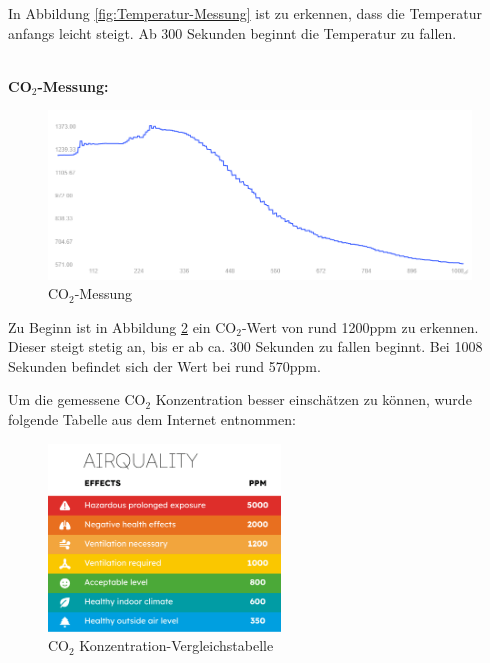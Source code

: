 \begin{inhalt}
In Abbildung \ref{fig:Temperatur-Messung} ist zu erkennen, dass die Temperatur anfangs leicht steigt. Ab 300 Sekunden beginnt die Temperatur zu fallen. 

\bigskip \\

\textbf{CO$_2$-Messung:}

\begin{figure}[!htb]
\centering
\includegraphics[width=1\textwidth]{files/Tobias/pics/Messungen/co2.PNG}
\caption[CO$_2$-Messung]{CO$_2$-Messung}
\label{fig:CO$_2$-Messung}
\end{figure}

Zu Beginn ist in Abbildung \ref{fig:CO$_2$-Messung} ein CO$_2$-Wert von rund 1200ppm zu erkennen. Dieser steigt stetig an, bis er ab ca. 300 Sekunden zu fallen beginnt. Bei 1008 Sekunden befindet sich der Wert bei rund 570ppm. 


Um die gemessene CO$_2$ Konzentration besser einschätzen zu können, wurde folgende Tabelle aus dem Internet entnommen: 
\begin{figure}[!htb]
\centering
\includegraphics[width=0.55\textwidth]{files/Tobias/pics/Tabellen/PPM-table.png}
\caption[CO$_2$ Konzentration-Vergleichstabelle]{CO$_2$ Konzentration-Vergleichstabelle}
\label{fig:CO$_2$-Messung}
\end{figure}



\bigskip \\


\end{inhalt}
